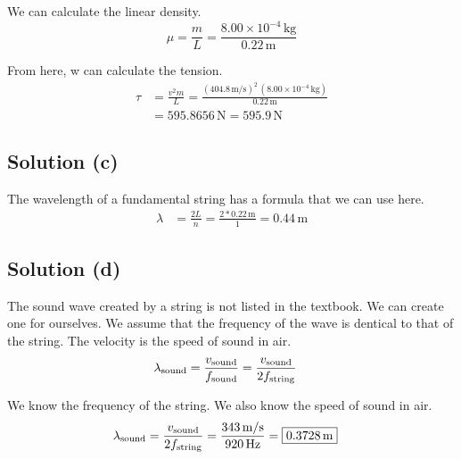 \documentclass[12pt]{article}
\newcommand{\E}[1]{\times 10^{#1}}
\begin{document}
            We can calculate the linear density.
            \begin{equation}
                \mu =   \frac{m}{L}
                    =   \frac{8.00\E{-4}\,\unit{\kilo\gram}}{0.22\,\unit{\meter}}
            \end{equation}

            From here, w can calculate the tension.
            \begin{align}
                \tau    &=  \frac{v^2 m}{L}
                    =   \frac{(404.8\,\unit{\meter/\second})^2\,(8.00\E{-4}\,\unit{\kilo\gram})}{0.22\,\unit{\meter}}\\
                    &=  595.8656\,\unit{\newton}
                    =   \boxed{595.9\,\unit{\newton}}
            \end{align}

        \subsection{Solution (c)}
            The wavelength of a fundamental string has a formula that we can use here.
            \begin{align}
                \lambda &=  \frac{2L}{n}
                    =   \frac{2 * 0.22\,\unit{\meter}}{1}
                    =   \boxed{0.44\,\unit{\meter}}
            \end{align}

        \subsection{Solution (d)}
            The sound wave created by a string is not listed in the textbook. 
            We can create one for ourselves.
            We assume that the frequency of the wave is dentical to that of the string.
            The velocity is the speed of sound in air.
            \begin{align}
                \lambda_{\rm sound} &=  \frac{v_{\rm sound}}{f_{\rm sound}}
                    =   \frac{v_{\rm sound}}{2f_{\rm string}}
            \end{align}

            We know the frequency of the string.
            We also know the speed of sound in air.
            \begin{align}
                \lambda_{\rm sound} &=  \frac{v_{\rm sound}}{2f_{\rm string}}
                    =   \frac{343\,\unit{\meter/\second}}{920\,\unit{\hertz}}
                    =   \boxed{0.3728\,\unit{\meter}}
            \end{align}
\end{document}
